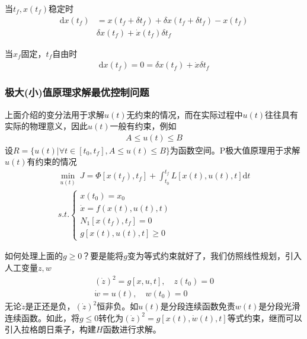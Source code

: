             \par
            当$t_f,x(t_f)$稳定时
            \begin{align*}
            \mathrm{d}x(t_f) & = x(t_f+\delta t_f) + \delta x(t_f+\delta t_f) - x(t_f)\\
            & \delta x(t_f)+\dot{x}(t_f)\delta t_f
            \end{align*}
            \par
            当$x_f$固定，$t_f$自由时
            \begin{align*}
            \mathrm{d}x(t_f) = 0= \delta x(t_f)+\dot{x}\delta t_f
            \end{align*}
        \subsubsection{极大(小)值原理求解最优控制问题}
            \par
            上面介绍的变分法用于求解$u(t)$无约束的情况，而在实际过程中$u(t)$往往具有实际的物理意义，因此$u(t)$一般有约束，例如
            \begin{align*}
            A \leqslant u(t) \leqslant B
            \end{align*}
            设$R=\{u(t)|\forall t\in [t_0,t_f],A \leqslant u(t) \leqslant B\}$为函数空间。P极大值原理用于求解$u(t)$有约束的情况
            \begin{align*}
            \min_{u(t)} \ J = \Phi[x(t_f),t_f]+\int_{t_0}^{t_f} L[x(t),u(t),t]\mathrm{d}t\\
            s.t.\left\{
            \begin{aligned}
            x(t_0) = x_0\\
            \dot{x} = f(x(t),u(t),t)\\
            N_1[x(t_f),t_f] = 0\\
            g[x(t),u(t),t] \geqslant 0
            \end{aligned}
            \right.
            \end{align*}
            \par
            如何处理上面的$g \geqslant 0$？要是能将$g$变为等式约束就好了，我们仿照线性规划，引入人工变量$z,w$
            \begin{align*}
            (\dot{z})^2 = g[x,u,t] ,\quad z(t_0) = 0\\
            \dot{w} = u(t),\quad w(t_0)=0
            \end{align*}
            无论$\dot{z}$是正还是负，$(\dot{z})^2$恒非负。如$u(t)$是分段连续函数免责$w(t)$是分段光滑连续函数。如此，将$g \leqslant 0$转化为$(\dot{z})^2 =g[x(t),\dot{w}(t),t] $等式约束，继而可以引入拉格朗日乘子，构建$H$函数进行求解。
